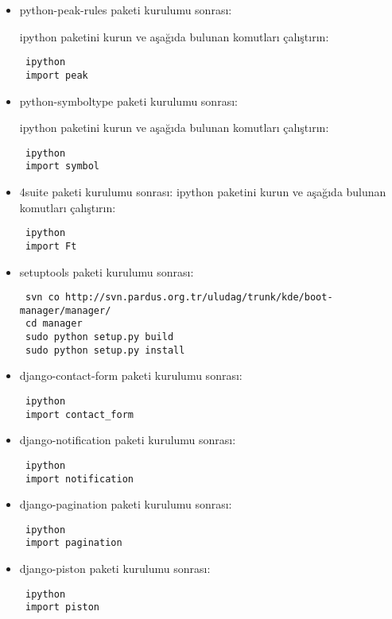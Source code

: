 \documentclass[a4paper,10pt]{article}
\begin{document}
\begin{itemize}
\item python-peak-rules paketi kurulumu sonrası:

ipython paketini kurun ve aşağıda bulunan komutları çalıştırın:
\begin{verbatim}
 ipython
 import peak
\end{verbatim}

\item python-symboltype paketi kurulumu sonrası:

ipython paketini kurun ve aşağıda bulunan komutları çalıştırın:
\begin{verbatim}
 ipython
 import symbol
\end{verbatim}

\item 4suite paketi kurulumu sonrası:
ipython paketini kurun ve aşağıda bulunan komutları çalıştırın:
\begin{verbatim}
 ipython
 import Ft
\end{verbatim}


\item setuptools paketi kurulumu sonrası:
\begin{verbatim}
 svn co http://svn.pardus.org.tr/uludag/trunk/kde/boot-manager/manager/
 cd manager
 sudo python setup.py build 
 sudo python setup.py install
\end{verbatim}
\item django-contact-form paketi kurulumu sonrası:

\begin{verbatim}
 ipython
 import contact_form
\end{verbatim}

\item django-notification paketi kurulumu sonrası:

\begin{verbatim}
 ipython
 import notification
\end{verbatim}

\item django-pagination paketi kurulumu sonrası:

\begin{verbatim}
 ipython
 import pagination
\end{verbatim}

\item django-piston paketi kurulumu sonrası:

\begin{verbatim}
 ipython
 import piston
\end{verbatim}


\end{itemize}
\end{document}
